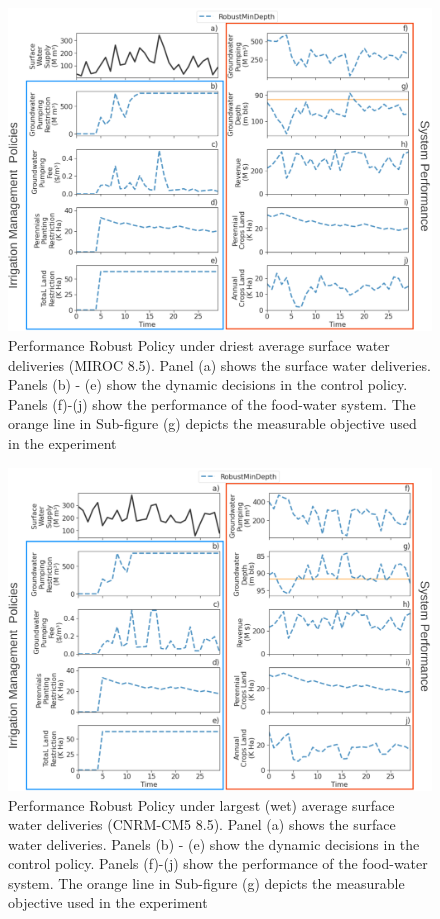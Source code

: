 \documentclass[11pt,a4paper]{article}
\begin{document}
\begin{figure}[H]
    \centering
    \includegraphics[width=1\textwidth]{./figs/robust_dry_performance.png}
    \caption{Performance Robust Policy under driest average surface water deliveries (MIROC 8.5). Panel (a) shows the surface water deliveries. Panels (b) - (e) show the dynamic decisions in the control policy. Panels (f)-(j) show the performance of the food-water system. The orange line in Sub-figure (g) depicts the measurable objective used in the experiment}
    \label{fig:m1esh1}
\end{figure}



\begin{figure}[H]
    \centering
    \includegraphics[width=1\textwidth]{./figs/robust_wet_performance.png}
    \caption{Performance Robust Policy under largest (wet) average surface water deliveries (CNRM-CM5 8.5). Panel (a) shows the surface water deliveries. Panels (b) - (e) show the dynamic decisions in the control policy. Panels (f)-(j) show the performance of the food-water system. The orange line in Sub-figure (g) depicts the measurable objective used in the experiment}
    \label{fig:m1esh1}
\end{figure}
\end{document}
